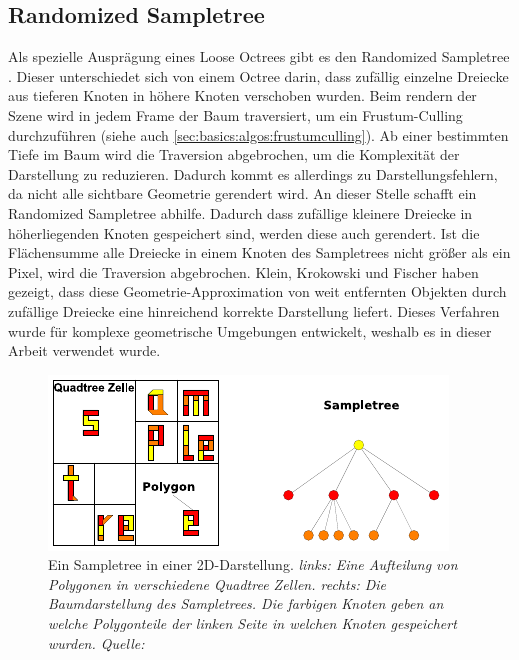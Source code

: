 \subsection{Randomized Sampletree}
\label{sec:basics:sampletree}
Als spezielle Ausprägung eines Loose Octrees gibt es den Randomized Sampletree \cite{klein}. Dieser unterschiedet sich von einem Octree darin, dass zufällig einzelne Dreiecke aus tieferen Knoten in höhere Knoten verschoben  wurden. Beim rendern der Szene wird in jedem Frame der Baum traversiert, um ein Frustum-Culling durchzuführen (siehe auch \ref{sec:basics:algos:frustumculling}). Ab einer bestimmten Tiefe im Baum wird die Traversion abgebrochen, um die Komplexität der Darstellung zu reduzieren. Dadurch kommt es allerdings zu Darstellungsfehlern, da nicht alle sichtbare Geometrie gerendert wird. An dieser Stelle schafft ein Randomized Sampletree abhilfe. Dadurch dass zufällige kleinere Dreiecke in höherliegenden Knoten gespeichert sind, werden diese auch gerendert. Ist die Flächensumme alle Dreiecke in einem Knoten des Sampletrees nicht größer als ein Pixel, wird die Traversion abgebrochen. Klein, Krokowski und Fischer \cite{klein} haben gezeigt, dass diese Geometrie-Approximation von weit entfernten Objekten durch zufällige Dreiecke eine hinreichend korrekte Darstellung liefert. Dieses Verfahren wurde für komplexe geometrische Umgebungen entwickelt, weshalb es in dieser Arbeit verwendet wurde.
\begin{figure}
 \centering
  \includegraphics[scale=1.7]{images/sampletree2.pdf}
  \caption{Ein Sampletree in einer 2D-Darstellung. \textit{links: Eine Aufteilung von Polygonen in verschiedene Quadtree Zellen. rechts: Die Baumdarstellung des Sampletrees. Die farbigen Knoten geben an welche Polygonteile der linken Seite in welchen Knoten gespeichert wurden. Quelle: \cite{klein}}}
 \label{fig:basics:sampletree}
\end{figure}

